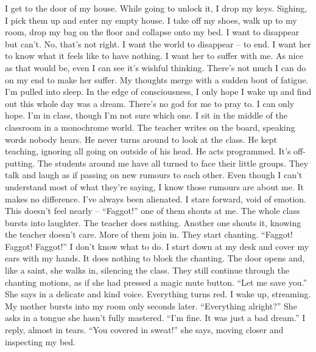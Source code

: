 \documentclass[a4paper, 12pt]{book}
\begin{document}
\begin{CJK*}{UTF8}{min}
\newline
\tab
I get to the door of my house. While going to unlock it, I drop my keys. Sighing, I pick them up and enter my empty house. I take off my shoes, walk up to my room, drop my bag on the floor and collapse onto my bed. I want to disappear but can’t. No, that’s not right. I want the world to disappear -- to end. I want her to know what it feels like to have nothing. I want her to suffer with me.
\newline
\tab
As nice as that would be, even I can see it’s wishful thinking. There’s not much I can do on my end to make her suffer. My thoughts merge with a sudden bout of fatigue. I’m pulled into sleep. In the edge of consciousness, I only hope I wake up and find out this whole day was a dream. There’s no god for me to pray to. I can only hope. 
\newline
\tab
I’m in class, though I’m not sure which one. I sit in the middle of the classroom in a monochrome world. The teacher writes on the board, speaking words nobody hears. He never turns around to look at the class. He kept teaching, ignoring all going on outside of his head. He acts programmed. It’s off-putting. The students around me have all turned to face their little groups. They talk and laugh as if passing on new rumours to each other. Even though I can’t understand most of what they’re saying, I know those rumours are about me. It makes no difference. I’ve always been alienated. I stare forward, void of emotion. This doesn’t feel nearly -- ``Faggot!'' one of them shouts at me. The whole class bursts into laughter. The teacher does nothing. Another one shouts it, knowing the teacher doesn’t care. More of them join in. They start chanting. ``Faggot! Faggot! Faggot!'' I don’t know what to do. I start down at my desk and cover my ears with my hands. It does nothing to block the chanting. The door opens and, like a saint, she walks in, silencing the class. They still continue through the chanting motions, as if she had pressed a magic mute button. ``Let me save you.'' She says in a delicate and kind voice. Everything turns red.
\newline
\tab
I wake up, streaming. My mother bursts into my room only seconds later. ``Everything alright?'' She asks in a tongue she hasn’t fully mastered.
\newline
\tab
``I’m fine. It was just a bad dream.'' I reply, almost in tears.
\newline
\tab
``You covered in sweat!'' she says, moving closer and inspecting my bed. 
\newline

\end{CJK*}
\end{document}
